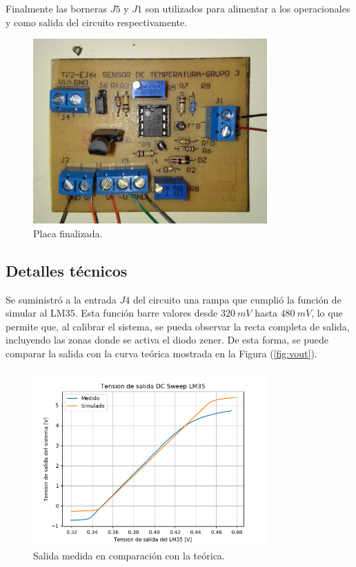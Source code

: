 \documentclass[a4paper]{article}
\begin{document}
Finalmente las borneras $J5$ y $J1$ son utilizados para alimentar a los operacionales y como salida del circuito respectivamente.

\begin{figure}[H]
	\centering
	\includegraphics[width=0.8\textwidth]{Ejercicio6/Imagenes/SDT-TCG3.jpg}
	\caption{Placa finalizada.}
	\label{fig:placa}
\end{figure}

\subsection{Detalles técnicos}
Se suministró a la entrada $J4$ del circuito una rampa que cumplió la función de simular al LM35. Esta función barre valores desde $320 \ mV$ hasta $480 \ mV$, lo que permite que, al calibrar el sistema, se pueda observar la recta completa de salida, incluyendo las zonas donde se activa el diodo zener. De esta forma, se puede comparar la salida con la curva teórica mostrada en la Figura (\ref{fig:vout}).

\begin{figure}[H]
	\centering
	\includegraphics[width=0.8\textwidth]{Ejercicio6/Imagenes/Teovsmed.png}
	\caption{Salida medida en comparación con la teórica.}
	\label{fig:comp1}
\end{figure}
\end{document}
